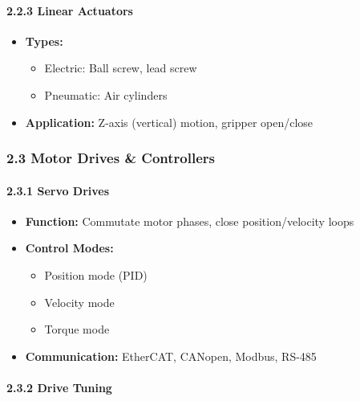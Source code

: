 \documentclass[
]{article}
\providecommand{\tightlist}{%
  \setlength{\itemsep}{0pt}\setlength{\parskip}{0pt}}
\begin{document}
\hypertarget{linear-actuators}{%
\paragraph{2.2.3 Linear Actuators}\label{linear-actuators}}

\begin{itemize}
\tightlist
\item
  \textbf{Types:}

  \begin{itemize}
  \tightlist
  \item
    Electric: Ball screw, lead screw
  \item
    Pneumatic: Air cylinders
  \end{itemize}
\item
  \textbf{Application:} Z-axis (vertical) motion, gripper open/close
\end{itemize}

\hypertarget{motor-drives-controllers}{%
\subsubsection{2.3 Motor Drives \&
Controllers}\label{motor-drives-controllers}}

\hypertarget{servo-drives}{%
\paragraph{2.3.1 Servo Drives}\label{servo-drives}}

\begin{itemize}
\tightlist
\item
  \textbf{Function:} Commutate motor phases, close position/velocity
  loops
\item
  \textbf{Control Modes:}

  \begin{itemize}
  \tightlist
  \item
    Position mode (PID)
  \item
    Velocity mode
  \item
    Torque mode
  \end{itemize}
\item
  \textbf{Communication:} EtherCAT, CANopen, Modbus, RS-485
\end{itemize}

\hypertarget{drive-tuning}{%
\paragraph{2.3.2 Drive Tuning}\label{drive-tuning}}
\end{document}
